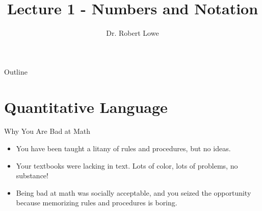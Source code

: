 \documentclass{beamer}
\title{Lecture 1 - Numbers and Notation}
\author{Dr. Robert Lowe\\}
\institute[Maryville College] %
{
  Division of Mathematics and Computer Science\\
  Maryville College
}
\date[]{}
\begin{document}
\begin{frame}
  \titlepage
\end{frame}

\begin{frame}{Outline}
  \tableofcontents
\end{frame}


%
%

\section{Quantitative Language}

\begin{frame}{Why You Are Bad at Math}

\begin{itemize}[<+(1)->]
    \item You have been taught a litany of rules and procedures, but no ideas.
    \item Your textbooks were lacking in text.  Lots of color, lots of problems, no substance!
    \item Being bad at math was socially acceptable, and you seized the opportunity because memorizing rules and procedures is boring.
\end{itemize}

\end{frame}
\end{document}
